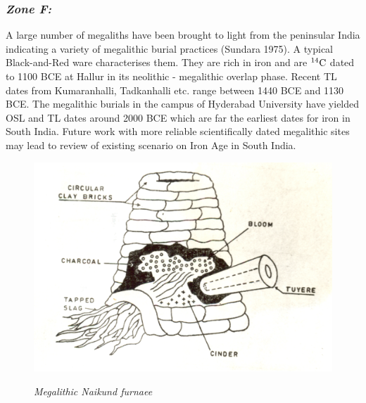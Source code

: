

\vspace{-.3cm}

\subsubsection*{\textit{Zone F:}}

\vspace{-.2cm}

A large number of megaliths have been brought to light from the peninsular India indicating a variety of megalithic burial practices (Sundara 1975). A typical Black-and-Red ware characterises them. They are rich in iron and are $^{14}{\rm C}$ dated to 1100 BCE at Hallur in its neolithic - megalithic overlap phase. Recent TL dates from Kumaranhalli, Tadkanhalli etc. range between 1440 BCE and 1130 BCE. The megalithic burials in the campus of Hyderabad University have yielded OSL and TL dates around 2000 BCE which are far the earliest dates for iron in South India. Future work with more reliable  scientifically  dated megalithic sites may lead to review of existing scenario on Iron Age in South India.

\begin{figure}[H]
\includegraphics[scale=.65]{images/chapter-3/fig002a.jpg}\label{chapter-3-fig5a}

\vspace{-.3cm}

\caption*{\textit{Megalithic Naikund furnaee}}
\end{figure}

